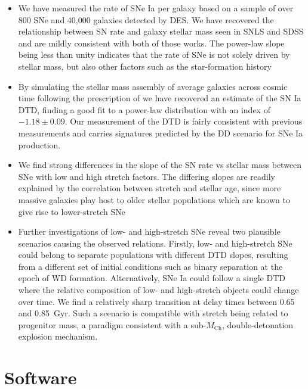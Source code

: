 \documentclass[fleqn,usenatbib]{mnras}
\begin{document}
\begin{itemize}
\item We have measured the rate of SNe Ia per galaxy based on a sample of over 800 SNe and 40,000 galaxies detected by DES. We have recovered the relationship between SN rate and galaxy stellar mass seen in SNLS \citep{Sullivan2006} and SDSS \citep{Smith2012} and are mildly consistent with both of those works. The power-law slope being less than unity indicates that the rate of SNe is not solely driven by stellar mass, but also other factors such as the star-formation history
    
\item By simulating the stellar mass assembly of average galaxies across cosmic time following the prescription of \citet{Childress2014} we have recovered an estimate of the SN Ia DTD, finding a good fit to a power-law distribution with an index of $-1.18 \pm0.09$. Our measurement of the DTD is fairly consistent with previous measurements \citep[e.g.][]{Graur2013,Maoz2012} and carries signatures predicted by the DD scenario for SNe Ia production.
    
\item We find strong differences in the slope of the SN rate vs stellar mass between SNe with low and high stretch factors. The differing slopes are readily explained by the correlation between stretch and stellar age, since more massive galaxies play host to older stellar populations which are known to give rise to lower-stretch SNe
    
\item Further investigations of low- and high-stretch SNe reveal two plausible scenarios causing the observed relations. Firstly, low- and high-stretch SNe could belong to separate populations with different DTD slopes, resulting from a different set of initial conditions such as binary separation at the epoch of WD formation. Alternatively, SNe Ia could follow a single DTD where the relative composition of low- and high-stretch objects could change over time. We find a relatively sharp transition at delay times between 0.65 and 0.85~Gyr. Such a scenario is compatible with stretch being related to progenitor mass, a paradigm consistent with a sub-$M_{\mathrm{Ch}}$, double-detonation explosion mechanism. 
\end{itemize}


\section*{Software}
\end{document}
